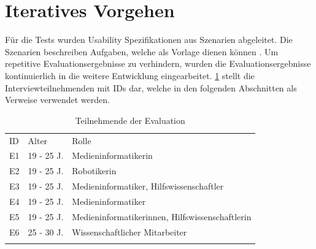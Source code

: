 \section{Iteratives Vorgehen}
Für die Tests wurden Usability Spezifikationen aus Szenarien abgeleitet. Die Szenarien beschreiben
Aufgaben, welche als Vorlage dienen können . Um repetitive Evaluationsergebnisse zu verhindern, wurden
die Evaluationsergebnisse kontinuierlich in die weitere Entwicklung eingearbeitet. \ref{table:e}
stellt die Interviewteilnehmenden  mit IDs dar, welche in den folgenden Abschnitten als Verweise
verwendet werden.

\begin{table}[h]
    \centering
    \caption{Teilnehmende der Evaluation}
    \begin{tabular}{lll}
        \arrayrulecolor{maincolor}\hline
        \sffamily\color{maincolor}ID & \sffamily\color{maincolor}Alter &
        \sffamily\color{maincolor}Rolle                                                                           \\
        \arrayrulecolor{maincolor}\hline
        E1                           & 19 - 25 J.                      &
        Medieninformatikerin                                                                                      \\
        E2                           & 19 - 25 J.                      & Robotikerin                              \\
        E3                           & 19 - 25 J.                      & Medieninformatiker, Hilfswissenschaftler \\
        E4                           & 19 - 25 J.                      & Medieninformatiker                       \\
        E5                           & 19 - 25 J.                      &
        Medieninformatikerinnen, Hilfswissenschaftlerin                                                           \\
        E6                           & 25 - 30 J.                      & Wissenschaftlicher Mitarbeiter           \\
        \arrayrulecolor{maincolor}\hline
    \end{tabular}
    \label{table:e}
\end{table}

